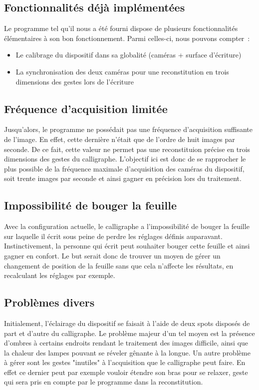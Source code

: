 \subsection{Fonctionnalités déjà implémentées}

Le programme tel qu'il nous a été fourni dispose de plusieurs fonctionnalités élémentaires à son bon fonctionnement. Parmi celles-ci, nous pouvons compter~:
\begin{itemize}
\item Le calibrage du dispositif dans sa globalité (caméras + surface d'écriture)
\item La synchronisation des deux caméras pour une reconstitution en trois dimensions des gestes lors de l'écriture
\end{itemize}

\subsection{Fréquence d'acquisition limitée}

Jusqu'alors, le programme ne possédait pas une fréquence d'acquisition suffisante de l'image. En effet, cette dernière n'était que de l'ordre de huit images par seconde. De ce fait, cette valeur ne permet pas une reconstituion précise en trois dimensions des gestes du calligraphe. L'objectif ici est donc de se rapprocher le plus possible de la fréquence maximale d'acquisition des caméras du dispositif, soit trente images par seconde et ainsi gagner en précision lors du traitement.

\subsection{Impossibilité de bouger la feuille}

Avec la configuration actuelle, le calligraphe a l'impossibilité de bouger la feuille sur laquelle il écrit sous peine de perdre les réglages définis auparavant. Instinctivement, la personne qui écrit peut souhaiter bouger cette feuille et ainsi gagner en confort. Le but serait donc de trouver un moyen de gérer un changement de position de la feuille sans que cela n'affecte les résultats, en recalculant les réglages par exemple.

\subsection{Problèmes divers}

Initialement, l'éclairage du dispositif se faisait à l'aide de deux spots disposés de part et d'autre du calligraphe. Le problème majeur d'un tel moyen est la présence d'ombres à certains endroits rendant le traitement des images difficile, ainsi que la chaleur des lampes pouvant se réveler gênante à la longue. Un autre problème à gérer sont les gestes "inutiles" à l'acquisition que le calligraphe peut faire. En effet ce dernier peut par exemple vouloir étendre son bras pour se relaxer, geste qui sera pris en compte par le programme dans la reconstitution.